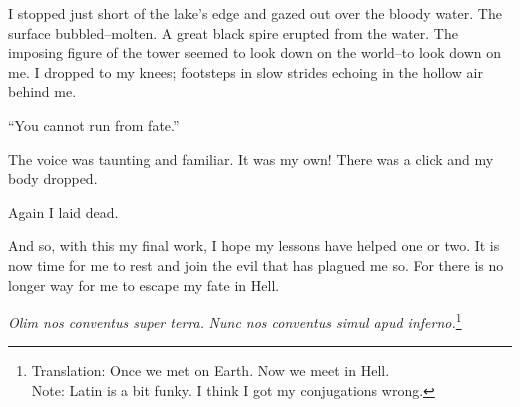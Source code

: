 \documentclass{article}
\begin{document}
I stopped just short of the lake's edge and gazed out over the bloody water.
The surface bubbled--molten.
A great black spire erupted from the water.
The imposing figure of the tower seemed to look down on the world--to
look down on me.
I dropped to my knees;
footsteps in slow strides echoing in the hollow air behind me.
\VV


``You cannot run from fate.''
\VV


\noindent
The voice was taunting and familiar.  It was my own!
There was a click and my body dropped.


Again I laid dead.
\vvvv


\noindent
And so, with this my final work,
I hope my lessons have helped one or two.
It is now time for me to rest and join the evil that has plagued me so.
For there is no longer way for me to escape my fate in Hell.
\VV

\begin{center}
\textit{Olim nos conventus super terra.}
\textit{Nunc nos conventus simul apud inferno.}\footnote{
Translation:  Once we met on Earth. Now we meet in Hell. \\
\indent
Note: Latin is a bit funky.  I think I got my conjugations wrong.
}
\end{center}
\end{document}
